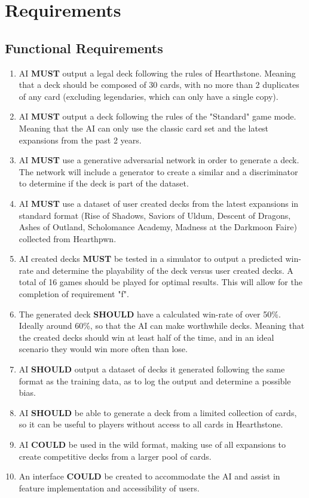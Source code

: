\documentclass{report} %
\renewcommand{\labelenumi}{\alph{enumi}.} %
\begin{document}
\chapter{Requirements}
	\section{Functional Requirements}
	\begin{enumerate}
		\item{ AI \textbf{MUST} output a legal deck following the rules of Hearthstone. Meaning that a deck should be composed of 30 cards, with no more than 2 duplicates of any card (excluding legendaries, which can only have a single copy).}
		\item AI \textbf{MUST} output a deck following the rules of the "Standard" game mode. Meaning that the AI can only use the classic card set and the latest expansions from the past 2 years.
		\item AI \textbf{MUST} use a generative adversarial network in order to generate a deck. The network will include a generator to create a similar and a discriminator to determine if the deck is part of the dataset.
		\item AI \textbf{MUST} use a dataset of user created decks from the latest expansions in standard format (Rise of Shadows, Saviors of Uldum, Descent of Dragons, Ashes of Outland, Scholomance Academy, Madness at the Darkmoon Faire) collected from Hearthpwn.
		\item AI created decks \textbf{MUST} be tested in a simulator to output a predicted win-rate and determine the playability of the deck versus user created decks. A total of 16 games should be played for optimal results. This will allow for the completion of requirement "f". 
		\item The generated deck \textbf{SHOULD} have a calculated win-rate of over 50\%. Ideally around 60\%, so that the AI can make worthwhile decks. Meaning that the created decks should win at least half of the time, and in an ideal scenario they would win more often than lose.
		\item AI \textbf{SHOULD} output a dataset of decks it generated following the same format as the training data, as to log the output and determine a possible bias.
		\item AI \textbf{SHOULD} be able to generate a deck from a limited collection of cards, so it can be useful to players without access to all cards in Hearthstone.
		\item AI \textbf{COULD} be used in the wild format, making use of all expansions to create competitive decks from a larger pool of cards.
		
		\item An interface \textbf{COULD} be created to accommodate the AI and assist in feature implementation and accessibility of users. 
	\end{enumerate}
\end{document}
